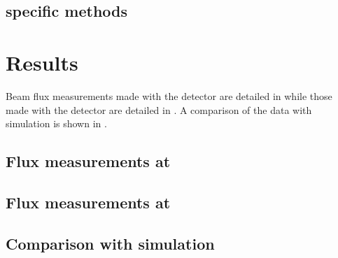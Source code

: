 \subsection{\SFour specific methods}
\label{sec:hptpc_beam_flux:methods:s4}

\section{Results}
\label{sec:hptpc_beam_flux:results}

Beam flux measurements made with the \SThree detector are detailed in  while those made with the \SFour detector are detailed in .
A comparison of the data with simulation is shown in .

\subsection{Flux measurements at \SThree}
\label{sec:hptpc_beam_flux:results:s3}

\subsection{Flux measurements at \SFour}
\label{sec:hptpc_beam_flux:results:s4}

\subsection{Comparison with simulation}
\label{sec:hptpc_beam_flux:results:MCData}

\begin{figure}[h]
  \begin{adjustbox}{max totalsize=.7\textwidth, center}
    
  \end{adjustbox}
  \caption[]{}
  \label{fig:tofS4Sim}
\end{figure}

